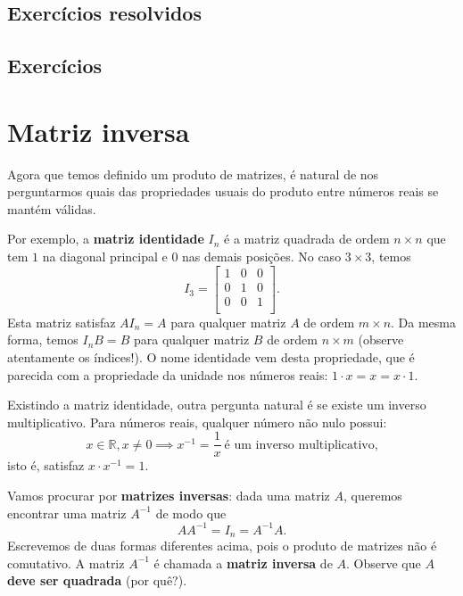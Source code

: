 \subsection*{Exercícios resolvidos}

\construirExeresol

\subsection*{Exercícios}

\construirExer

\section{Matriz inversa}

Agora que temos definido um produto de matrizes, é natural de nos perguntarmos quais das propriedades usuais do produto entre números reais se mantém válidas.

Por exemplo, a \textbf{matriz identidade} $I_n$ é a matriz quadrada de ordem $n \times n$ que tem $1$ na diagonal principal e $0$ nas demais posições. No caso $3 \times 3$, temos
\begin{equation}
I_3 =
\left[
\begin{array}{ccc}
1 & 0 & 0 \\
0 & 1 & 0 \\
0 & 0 & 1 \\
\end{array}
\right].
\end{equation} Esta matriz satisfaz $A I_n = A$ para qualquer matriz $A$ de ordem $m \times n$. Da mesma forma, temos $I_n B = B$ para qualquer matriz $B$ de ordem $n \times m$ (observe atentamente os índices!). O nome identidade vem desta propriedade, que é parecida com a propriedade da unidade nos números reais: $1\cdot x = x = x\cdot 1$.

Existindo a matriz identidade, outra pergunta natural é se existe um inverso multiplicativo. Para números reais, qualquer número não nulo possui:
\begin{equation}
x \in \mathbb{R}, x \neq 0 \implies x^{-1} = \frac{1}{x} \ \text{é um inverso multiplicativo,}
\end{equation} isto é, satisfaz $x\cdot x^{-1} = 1$.

Vamos procurar por \textbf{matrizes inversas}: dada uma matriz $A$, queremos encontrar uma matriz $A^{-1}$ de modo que
\begin{equation}
A A^{-1} = I_n = A^{-1} A.
\end{equation} Escrevemos de duas formas diferentes acima, pois o produto de matrizes não é comutativo. A matriz $A^{-1}$ é chamada a \textbf{matriz inversa} de $A$. Observe que  \textbf{$A$ deve ser quadrada} (por quê?).

